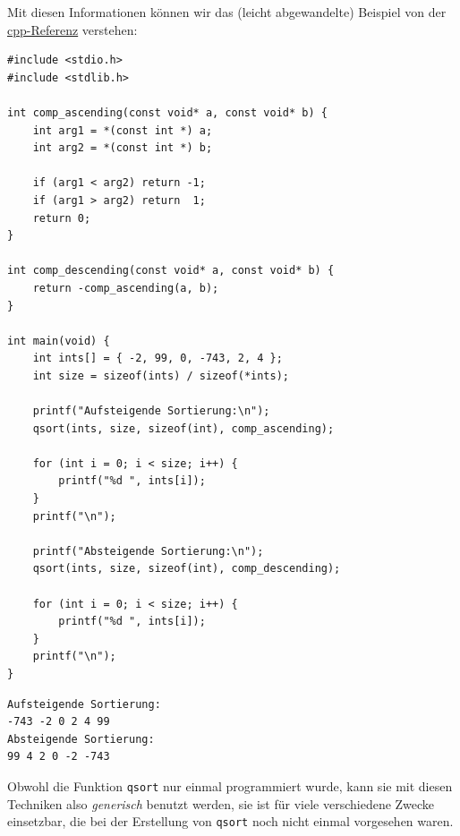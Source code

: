 Mit diesen Informationen können wir das (leicht abgewandelte) Beispiel von der \href{https://en.cppreference.com/w/c/algorithm/qsort}{cpp-Referenz} verstehen:

\begin{codebox}
\begin{verbatim}
#include <stdio.h>
#include <stdlib.h>
 
int comp_ascending(const void* a, const void* b) {
    int arg1 = *(const int *) a;
    int arg2 = *(const int *) b;
 
    if (arg1 < arg2) return -1;
    if (arg1 > arg2) return  1;
    return 0;
}

int comp_descending(const void* a, const void* b) {
    return -comp_ascending(a, b);
}

int main(void) {
    int ints[] = { -2, 99, 0, -743, 2, 4 };
    int size = sizeof(ints) / sizeof(*ints);
    
    printf("Aufsteigende Sortierung:\n");
    qsort(ints, size, sizeof(int), comp_ascending);
    
    for (int i = 0; i < size; i++) {
        printf("%d ", ints[i]);
    }
    printf("\n");
    
    printf("Absteigende Sortierung:\n");
    qsort(ints, size, sizeof(int), comp_descending);
    
    for (int i = 0; i < size; i++) {
        printf("%d ", ints[i]);
    }
    printf("\n");
}
\end{verbatim}
\end{codebox}

\begin{cmdbox}
\begin{verbatim}
Aufsteigende Sortierung:
-743 -2 0 2 4 99 
Absteigende Sortierung:
99 4 2 0 -2 -743 
\end{verbatim}
\end{cmdbox}

Obwohl die Funktion \texttt{qsort} nur einmal programmiert wurde, kann sie mit diesen Techniken also \emph{generisch} benutzt werden, \ie sie ist für viele verschiedene Zwecke einsetzbar, die bei der Erstellung von \texttt{qsort} noch nicht einmal vorgesehen waren.
